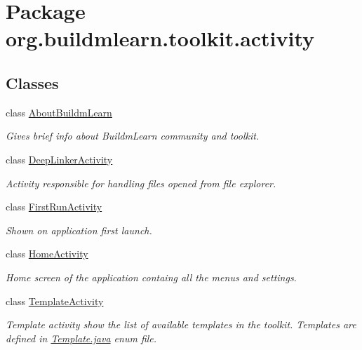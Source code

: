 \hypertarget{namespaceorg_1_1buildmlearn_1_1toolkit_1_1activity}{\section{Package org.\-buildmlearn.\-toolkit.\-activity}
\label{namespaceorg_1_1buildmlearn_1_1toolkit_1_1activity}
}
\subsection*{Classes}
\begin{DoxyCompactItemize}
\item 
class \hyperlink{classorg_1_1buildmlearn_1_1toolkit_1_1activity_1_1AboutBuildmLearn}{About\-Buildm\-Learn}
\begin{DoxyCompactList}\small\item\em Gives brief info about Buildm\-Learn community and toolkit. \end{DoxyCompactList}\item 
class \hyperlink{classorg_1_1buildmlearn_1_1toolkit_1_1activity_1_1DeepLinkerActivity}{Deep\-Linker\-Activity}
\begin{DoxyCompactList}\small\item\em Activity responsible for handling files opened from file explorer. \end{DoxyCompactList}\item 
class \hyperlink{classorg_1_1buildmlearn_1_1toolkit_1_1activity_1_1FirstRunActivity}{First\-Run\-Activity}
\begin{DoxyCompactList}\small\item\em Shown on application first launch. \end{DoxyCompactList}\item 
class \hyperlink{classorg_1_1buildmlearn_1_1toolkit_1_1activity_1_1HomeActivity}{Home\-Activity}
\begin{DoxyCompactList}\small\item\em Home screen of the application containg all the menus and settings. \end{DoxyCompactList}\item 
class \hyperlink{classorg_1_1buildmlearn_1_1toolkit_1_1activity_1_1TemplateActivity}{Template\-Activity}
\begin{DoxyCompactList}\small\item\em Template activity show the list of available templates in the toolkit. Templates are defined in \hyperlink{Template_8java}{Template.\-java} enum file. \end{DoxyCompactList}\item 

\end{DoxyCompactItemize}
